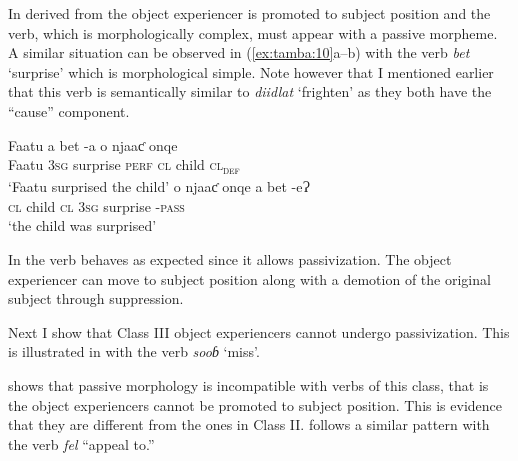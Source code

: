 \documentclass[output=paper]{langscibook}
\begin{document}
In  derived from  the object experiencer is promoted to subject position and the verb, which is morphologically complex, must appear with a passive morpheme. A similar situation can be observed in (\ref{ex:tamba:10}a--b) with the verb \textit{bet} ‘surprise’ which is morphological simple. Note however that I mentioned earlier that this verb is semantically similar to \textit{diidlat} ‘frighten’ as they both have the “cause” component. 

\ea \label{ex:tamba:10}
\ea \label{ex:tamba:10a}
\gll Faatu      a      bet      {}-a        o      njaaƈ onqe\\
Faatu      \textsc{3sg}  surprise \textsc{perf}   \textsc{cl}  child   \textsc{cl\textsubscript{def}}\\
\glt `Faatu surprised the child'
\ex \label{ex:tamba:10b}
\gll  o    njaaƈ  onqe  a      bet       {}-eɁ\\
\textsc{cl}  child   \textsc{cl}     \textsc{3sg}  surprise \textsc{{}-pass}\\
\glt `the child was surprised'
\z
\z

In  the verb behaves as expected since it allows passivization. The object experiencer can move to subject position along with a demotion of the original subject through suppression. 

Next I show that Class III object experiencers cannot undergo passivization. This is illustrated in  with the verb \textit{sooɓ} ‘miss’.

\ea \label{ex:tamba:11}
 \label{ex:tamba:11a}
 \label{ex:tamba:11b}
\z
\z

 shows that passive morphology is incompatible with verbs of this class, that is the object experiencers cannot be promoted to subject position. This is evidence that they are different from the ones in Class II.   follows a similar pattern  with the verb \textit{fel} “appeal to.”
\end{document}
